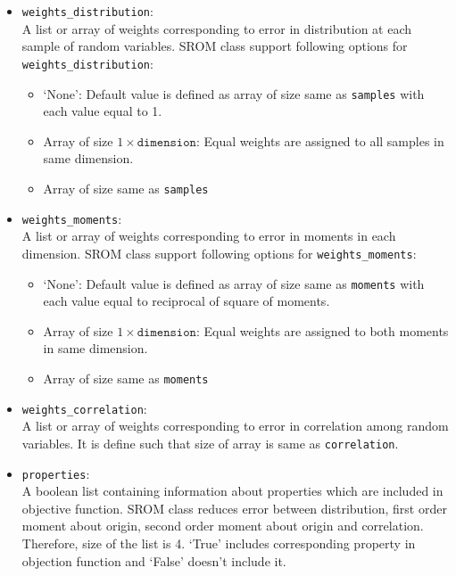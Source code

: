 \begin{itemize}
\item \texttt{weights\_distribution}:\\
A list or array of weights corresponding to error in distribution at each sample of random variables. SROM class support following options for \texttt{weights\_distribution}:
	\begin{itemize}
    	\item {`None'}:
        Default value is defined as array of size same as \texttt{samples} with each value equal to 1.
        \item {Array of size $1 \times \texttt{dimension}$}:
        Equal weights are assigned to all samples in same dimension.
        \item {Array of size same as \texttt{samples}}
    \end{itemize}
    
\item \texttt{weights\_moments}:\\
A list or array of weights corresponding to error in moments in each dimension. SROM class support following options for \texttt{weights\_moments}:
\begin{itemize}
    	\item {`None'}:
        Default value is defined as array of size same as \texttt{moments} with each value equal to reciprocal of square of moments.
        \item {Array of size $1 \times \texttt{dimension}$}:
        Equal weights are assigned to both moments in same dimension.
        \item {Array of size same as \texttt{moments}}
    \end{itemize}
    
\item \texttt{weights\_correlation}:\\
A list or array of weights corresponding to error in correlation among random variables. It is define such that size of array is same as \texttt{correlation}.

\item \texttt{properties}:\\
A boolean list containing information about properties which are included in objective function. SROM class reduces error between distribution, first order moment about origin, second order moment about origin and correlation. Therefore, size of the list is 4. `True' includes corresponding property in objection function and `False' doesn't include it.
\end{itemize}

